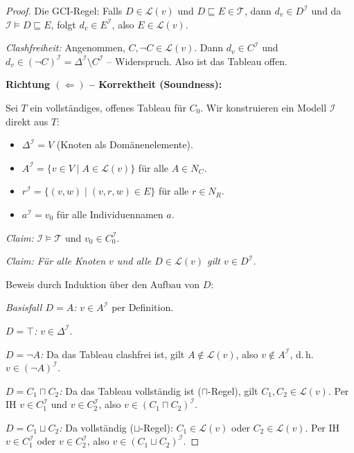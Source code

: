 ﻿\documentclass[a4paper,12pt]{article}
\theoremstyle{definition}
\theoremstyle{plain}
\theoremstyle{remark}
\newcommand{\Tbox}{\ensuremath{\mathcal{T}}}
\newcommand{\interp}[1]{\ensuremath{\mathcal{#1}}}
\newcommand{\Dom}[1]{\ensuremath{\Delta^{\interp{#1}}}}
\begin{document}
\begin{proof}
Die GCI-Regel: Falls $D \in \mathcal{L}(v)$ und
$D \sqsubseteq E \in \Tbox$, dann $d_v \in D^\interp{I}$
und da $\interp{I} \models D \sqsubseteq E$, folgt
$d_v \in E^\interp{I}$, also $E \in \mathcal{L}(v)$.

\textit{Clashfreiheit:}
Angenommen, $C, \neg C \in \mathcal{L}(v)$.
Dann $d_v \in C^\interp{I}$ und $d_v \in (\neg C)^\interp{I} = \Dom{I} \setminus C^\interp{I}$ -- Widerspruch.
Also ist das Tableau offen.

\textbf{Richtung $(\Leftarrow)$ -- Korrektheit (Soundness):}

Sei $T$ ein vollst{\"{a}}ndiges, offenes Tableau f{\"{u}}r $C_0$.
Wir konstruieren ein Modell $\interp{I}$ direkt aus $T$:

\begin{itemize}
  \item $\Dom{I} = V$ (Knoten als Dom{\"{a}}nenelemente).
  \item $A^\interp{I} = \{v \in V \mid A \in \mathcal{L}(v)\}$
        f{\"{u}}r alle $A \in N_C$.
  \item $r^\interp{I} = \{(v,w) \mid (v,r,w) \in E\}$
        f{\"{u}}r alle $r \in N_R$.
  \item $a^\interp{I} = v_0$ f{\"{u}}r alle Individuennamen $a$.
\end{itemize}

\textit{Claim:} $\interp{I} \models \Tbox$ und
$v_0 \in C_0^\interp{I}$.

\textit{Claim: F{\"{u}}r alle Knoten $v$ und alle
$D \in \mathcal{L}(v)$ gilt $v \in D^\interp{I}$.}

Beweis durch Induktion {\"{u}}ber den Aufbau von $D$:

\textit{Basisfall $D = A$:} $v \in A^\interp{I}$ per Definition. \checkmark

\textit{$D = \top$:} $v \in \Dom{I}$. \checkmark

\textit{$D = \neg A$:} Da das Tableau clashfrei ist,
gilt $A \notin \mathcal{L}(v)$, also $v \notin A^\interp{I}$,
d.\,h.\ $v \in (\neg A)^\interp{I}$. \checkmark

\textit{$D = C_1 \sqcap C_2$:}
Da das Tableau vollst{\"{a}}ndig ist ($\sqcap$-Regel), gilt
$C_1, C_2 \in \mathcal{L}(v)$.
Per IH $v \in C_1^\interp{I}$ und $v \in C_2^\interp{I}$,
also $v \in (C_1 \sqcap C_2)^\interp{I}$. \checkmark

\textit{$D = C_1 \sqcup C_2$:}
Da vollst{\"{a}}ndig ($\sqcup$-Regel): $C_1 \in \mathcal{L}(v)$
oder $C_2 \in \mathcal{L}(v)$.
Per IH $v \in C_1^\interp{I}$ oder $v \in C_2^\interp{I}$,
also $v \in (C_1 \sqcup C_2)^\interp{I}$. \checkmark


\end{proof}
\end{document}
